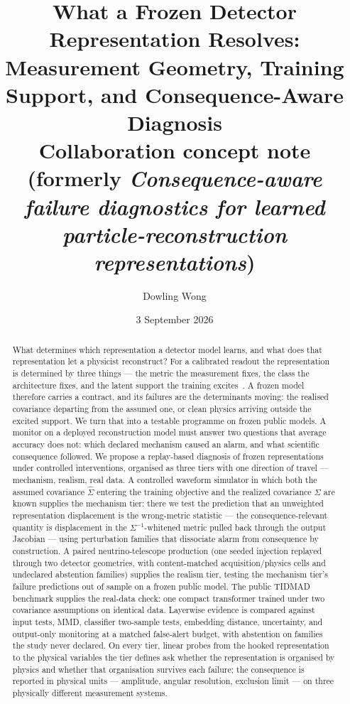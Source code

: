 \documentclass[10pt,twocolumn]{extarticle}
\title{\vspace{-1.55em}\textbf{What a Frozen Detector Representation Resolves:\\[-0.18em]
Measurement Geometry, Training Support, and Consequence-Aware Diagnosis}\\[-0.12em]
\normalsize Collaboration concept note (formerly \emph{Consequence-aware failure diagnostics for learned particle-reconstruction representations})}
\author{Dowling Wong}
\date{3 September 2026}
\begin{document}
\maketitle
\vspace{-1.9em}

\begin{abstract}
What determines which representation a detector model learns, and what does
that representation let a physicist reconstruct? For a calibrated readout the
representation is determined by three things --- the metric the measurement
fixes, the class the architecture fixes, and the latent support the training
excites~\cite{paper1}. A frozen model therefore carries a contract, and its
failures are the determinants moving: the realised covariance departing from
the assumed one, or clean physics arriving outside the excited support. We
turn that into a testable programme on frozen public models. A monitor on a
deployed reconstruction model must answer two questions that average accuracy
does not: which declared mechanism caused an alarm, and what scientific
consequence followed. We propose a replay-based diagnosis of frozen
representations under controlled interventions, organised as three tiers with
one direction of travel --- mechanism, realism, real data. A controlled
waveform simulator in which both the assumed covariance $\hat\Sigma$ entering
the training objective and the realized covariance $\Sigma$ are known supplies
the mechanism tier: there we test the prediction that an unweighted
representation displacement is the wrong-metric statistic --- the
consequence-relevant quantity is displacement in the $\Sigma^{-1}$-whitened
metric pulled back through the output Jacobian --- using perturbation families
that dissociate alarm from consequence by construction. A paired
neutrino-telescope production (one seeded injection replayed through two
detector geometries, with content-matched acquisition/physics cells and
undeclared abstention families) supplies the realism tier, testing the
mechanism tier's failure predictions out of sample on a frozen public model.
The public TIDMAD benchmark supplies the real-data check: one compact
transformer trained under two covariance assumptions on identical data.
Layerwise evidence is compared against input tests, MMD, classifier two-sample
tests, embedding distance, uncertainty, and output-only monitoring at a
matched false-alert budget, with abstention on families the study never
declared. On every tier, linear probes from the hooked representation to the
physical variables the tier defines ask whether the representation is
organised by physics and whether that organisation survives each failure; the
consequence is reported in physical units --- amplitude, angular resolution,
exclusion limit --- on three physically different measurement systems.
\end{abstract}
\end{document}
